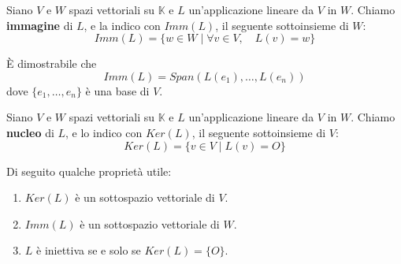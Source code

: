 \begin{defn}
	Siano $V$ e $W$ spazi vettoriali su $\mathbb{K}$ e $L$ un'applicazione
	lineare da $V$ in $W$. Chiamo \textbf{immagine} di $L$, e la indico con
	$Imm(L)$, il seguente sottoinsieme di $W$:
	\begin{equation*}
		Imm(L) = \{w \in W \mid \forall v \in V, \quad L(v) = w\}
	\end{equation*}
\end{defn}

\begin{proposition}
	\`E dimostrabile che \[ Imm(L) = Span(L(e_1), \dots, L(e_n)) \]
	dove $\{e_1, \dots, e_n\}$ \`e una base di $V$.
\end{proposition}

\begin{defn}
	Siano $V$ e $W$ spazi vettoriali su $\mathbb{K}$ e $L$ un'applicazione
	lineare da $V$ in $W$. Chiamo \textbf{nucleo} di $L$, e lo indico con
	$Ker(L)$, il seguente sottoinsieme di $V$:
	\begin{equation*}
		Ker(L) = \{v \in V \mid L(v) = O\}
	\end{equation*}
\end{defn}

Di seguito qualche propriet\`a utile:
\begin{enumerate}
	\item $Ker(L)$ \`e un sottospazio vettoriale di $V$.
	\item $Imm(L)$ \`e un sottospazio vettoriale di $W$.
	\item $L$ \`e iniettiva se e solo se $Ker(L) = \{O\}$.
\end{enumerate}